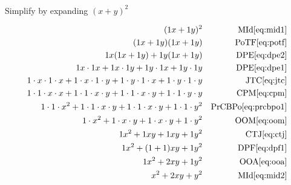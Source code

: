 \documentclass[20150903-160354-rs2.2-MarksMathNotebook.tex]{subfiles}
\begin{document}
\begin{example}[id:20151018-183900] \label{20151018-183900} \hfill \\
Simplify by expanding $(x+y)^2$

\soln

\solnsteps
\begin{align*}
(1x+1y)^2 && \text{MId} \eqref{eq:mid1} \\
(1x+1y)(1x+1y) && \text{PoTF} \eqref{eq:potf} \\
1x(1x+1y)+ 1y(1x+1y) && \text{DPE} \eqref{eq:dpe2} \\
1x \cdot 1x + 1x \cdot 1y + 1y \cdot 1x + 1y \cdot 1y && \text{DPE} \eqref{eq:dpe1} \\
1 \cdot x \cdot 1 \cdot x + 1 \cdot x \cdot 1 \cdot y + 1 \cdot y \cdot 1 \cdot x + 1 \cdot y \cdot 1 \cdot y && \text{JTC} \eqref{eq:jtc} \\
1 \cdot 1 \cdot x \cdot x + 1 \cdot 1 \cdot x \cdot y + 1 \cdot 1 \cdot x \cdot y + 1 \cdot 1 \cdot y \cdot y && \text{CPM} \eqref{eq:cpm} \\
1 \cdot 1 \cdot x^2 + 1 \cdot 1 \cdot x \cdot y + 1 \cdot 1 \cdot x \cdot y + 1 \cdot 1 \cdot y^2 && \text{PrCBPo} \eqref{eq:prcbpo1} \\
1 \cdot x^2 + 1 \cdot x \cdot y + 1 \cdot x \cdot y + 1 \cdot y^2 && \text{OOM} \eqref{eq:oom} \\
1x^2 + 1xy + 1xy + 1y^2 && \text{CTJ} \eqref{eq:ctj} \\
1x^2 + (1+1)xy + 1y^2 && \text{DPF} \eqref{eq:dpf1} \\
1x^2 + 2xy + 1y^2 && \text{OOA} \eqref{eq:ooa} \\
x^2 + 2xy + y^2 && \text{MId} \eqref{eq:mid2} 
\end{align*}
\end{example}
\end{document}
